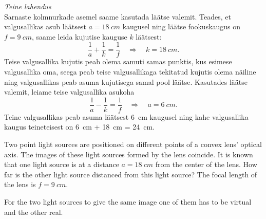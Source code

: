\vspace{\baselineskip}
\emph{Teine lahendus}\\
Sarnaste kolmnurkade asemel saame kasutada läätse valemit. Teades, et valgusallikas asub läätsest $a = \SI{18}{cm}$ kaugusel ning läätse fookuskaugus on $f=\SI{9}{cm}$, saame leida kujutise kauguse $k$ läätsest:
\[ \frac{1}{a} + \frac{1}{k} = \frac{1}{f} \quad\Rightarrow\quad k = \SI{18}{cm}. \]
Teise valgusallika kujutis peab olema samuti samas punktis, kus esimese valgusallika oma, seega peab teise valgusallikaga tekitatud kujutis olema näiline ning valgusallikas peab asuma kujutisega samal pool läätse. Kasutades läätse valemit, leiame teise valgusallika asukoha
\[ \frac{1}{a} - \frac{1}{k} = \frac{1}{f} \quad\Rightarrow\quad a = \SI{6}{cm}. \]
Teine valgusallikas peab asuma läätsest \SI{6}{cm} kaugusel ning kahe valgusallika kaugus teineteisest on \SI{6}{cm} + \SI{18}{cm} = \SI{24}{cm}.

Two point light sources are positioned on different points of a convex lens’ optical axis. The images of these light sources formed by the lens coincide. It is known that one light source is at a distance $a=\SI{18}{cm}$ from the center of the lens. How far is the other light source distanced from this light source? The focal length of the lens is $f=\SI{9}{cm}$.

\hinteng
For the two light sources to give the same image one of them has to be virtual and the other real.

